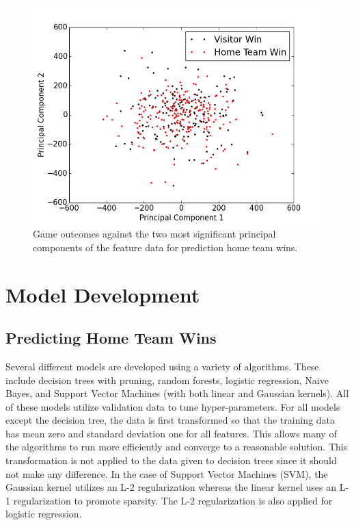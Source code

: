 \documentclass[12pt]{article}
\begin{document}
\begin{figure}[h!]
	\begin{center}
		\includegraphics[scale=0.45]{figs/pca.png}
	\end{center}
	\caption{Game outcomes against the two most significant principal components of the feature data for prediction home team wins.}
	\label{fig::pca}
\end{figure}

\section{Model Development}
\subsection{Predicting Home Team Wins}
Several different models are developed using a variety of algorithms. These include decision trees with pruning, random forests, logistic regression, Naive Bayes, and Support Vector Machines (with both linear and Gaussian kernels). All of these models utilize validation data to tune hyper-parameters. For all models except the decision tree, the data is first transformed so that the training data has mean zero and standard deviation one for all features. This allows many of the algorithms to run more efficiently and converge to a reasonable solution. This transformation is not applied to the data given to decision trees since it should not make any difference. In the case of Support Vector Machines (SVM), the Gaussian kernel utilizes an L-2 regularization whereas the linear kernel uses an L-1 regularization to promote sparsity. The L-2 regularization is also applied for logistic regression.
\end{document}
